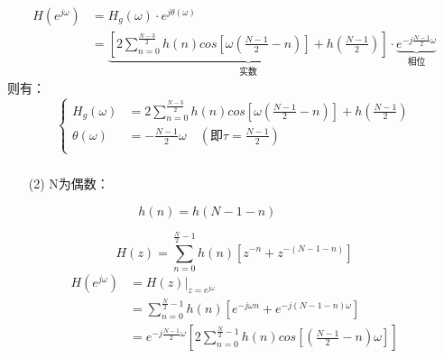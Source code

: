 \documentclass[notheorems,compress,mathserif,table]{beamer}
\begin{document}
\begin{frame}[allowframebreaks]\frametitle{}%
\begin{equation*}
\begin{split}
H(e^{j\omega})  &= H_g(\omega)\cdot e^{j\theta(\omega)}\\
    &=\underbrace{\left[2\sum_{n=0}^{\frac{N-3}{2}}h(n)cos[\omega
       (\frac{N-1}{2}-n)]+h(\frac{N-1}{2})\right]}_{\mbox{实数}}
       \cdot\underbrace{e^{-j\frac{N-1}{2}\omega}}_{\mbox{相位}}
\end{split}
\end{equation*}
则有：
$$
\left\{ \begin{aligned}
    H_g(\omega)   &= 2\sum_{n=0}^{\frac{N-3}{2}}h(n)
                     cos[\omega(\frac{N-1}{2}-n)]+h(\frac{N-1}{2})\\
    \theta(\omega)&=  -\frac{N-1}{2}\omega\quad
                      (\mbox{即}\tau =\frac{N-1}{2}) \\
\end{aligned} \right.
$$

\end{frame}



\begin{frame}[allowframebreaks]\frametitle{}%


\begin{enumerate}
\item [(2)] N为偶数：\par

$$\quad\quad\quad\quad h(n) = h(N-1-n)\quad\quad\quad\quad\quad\quad\quad\quad\quad\quad$$
\end{enumerate}
            $$H(z)= \sum_{n=0}^{\frac{N}{2}-1}h(n)\left[ z^{-n}+z^{-(N-1-n)}\right]$$
            \begin{equation*}
            \begin{split}
              H(e^{j\omega})&= H(z)|_{z=e^{j\omega}}\\
                 &= \sum_{n=0}^{\frac{N}{2}-1}h(n)\left[e^{-j\omega n}+
                    e^{-j(N-1-n)\omega}\right]\\
                 &= e^{-j\frac{N-1}{2}\omega}\left[
                    2\sum_{n=0}^{\frac{N}{2}-1}h(n)cos\left[(\frac{N-1}{2}
                    -n)\omega\right]\right]
            \end{split}
            \end{equation*}
\end{frame}
\end{document}
